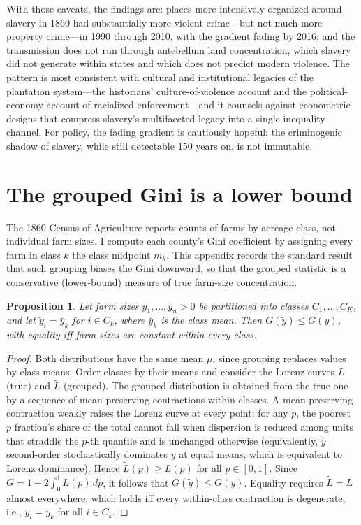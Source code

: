 \documentclass[12pt]{article}
\newtheorem{proposition}{Proposition}
\begin{document}
With those caveats, the findings are: places more intensively organized around slavery in 1860 had substantially more violent crime---but not much more property crime---in 1990 through 2010, with the gradient fading by 2016; and the transmission does not run through antebellum land concentration, which slavery did not generate within states and which does not predict modern violence. The pattern is most consistent with cultural and institutional legacies of the plantation system---the historians' culture-of-violence account and the political-economy account of racialized enforcement---and it counsels against econometric designs that compress slavery's multifaceted legacy into a single inequality channel. For policy, the fading gradient is cautiously hopeful: the criminogenic shadow of slavery, while still detectable 150 years on, is not immutable.

\newpage
\appendix

\section{The grouped Gini is a lower bound}\label{app:gini}

The 1860 Census of Agriculture reports counts of farms by acreage class, not individual farm sizes. I compute each county's Gini coefficient by assigning every farm in class $k$ the class midpoint $m_k$. This appendix records the standard result that such grouping biases the Gini downward, so that the grouped statistic is a conservative (lower-bound) measure of true farm-size concentration.

\begin{proposition}\label{prop:gini}
Let farm sizes $y_1,\dots,y_n > 0$ be partitioned into classes $C_1,\dots,C_K$, and let $\tilde{y}_i = \bar{y}_k$ for $i \in C_k$, where $\bar{y}_k$ is the class mean. Then $G(\tilde{y}) \leq G(y)$, with equality iff farm sizes are constant within every class.
\end{proposition}

\begin{proof}
Both distributions have the same mean $\mu$, since grouping replaces values by class means. Order classes by their means and consider the Lorenz curves $L$ (true) and $\tilde{L}$ (grouped). The grouped distribution is obtained from the true one by a sequence of mean-preserving contractions within classes. A mean-preserving contraction weakly raises the Lorenz curve at every point: for any $p$, the poorest $p$ fraction's share of the total cannot fall when dispersion is reduced among units that straddle the $p$-th quantile and is unchanged otherwise (equivalently, $\tilde{y}$ second-order stochastically dominates $y$ at equal means, which is equivalent to Lorenz dominance). Hence $\tilde{L}(p) \geq L(p)$ for all $p \in [0,1]$. Since $G = 1 - 2\int_0^1 L(p)\,dp$, it follows that $G(\tilde{y}) \leq G(y)$. Equality requires $\tilde{L} = L$ almost everywhere, which holds iff every within-class contraction is degenerate, i.e., $y_i = \bar{y}_k$ for all $i \in C_k$.
\end{proof}
\end{document}
